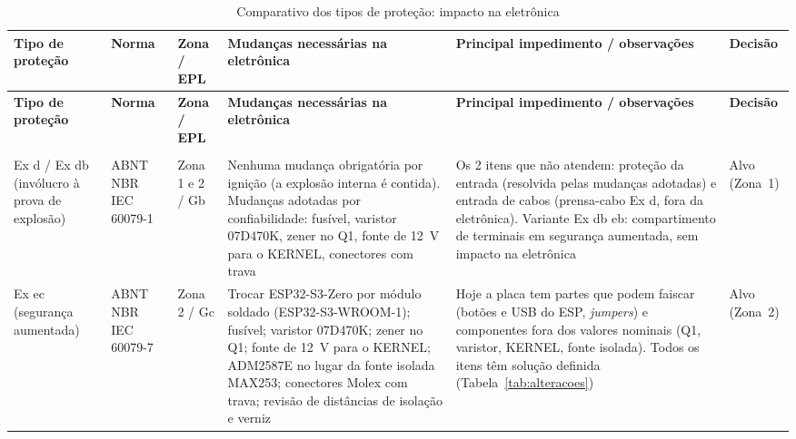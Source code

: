 \documentclass[a4paper, 12pt]{article}
\begin{document}
{\footnotesize
\renewcommand{\arraystretch}{1.25}
\begin{longtable}{|>{\raggedright\arraybackslash}p{2.0cm}|>{\raggedright\arraybackslash}p{1.6cm}|>{\raggedright\arraybackslash}p{1.4cm}|>{\raggedright\arraybackslash}p{3.5cm}|>{\raggedright\arraybackslash}p{3.3cm}|>{\raggedright\arraybackslash}p{1.85cm}|}
    \caption{Comparativo dos tipos de proteção: impacto na eletrônica}\label{tab:tiposprotecao}\\
    \hline
    \centering\arraybackslash\textbf{Tipo de proteção} & \centering\arraybackslash\textbf{Norma} & \centering\arraybackslash\textbf{Zona / EPL} & \centering\arraybackslash\textbf{Mudanças necessárias na eletrônica} & \centering\arraybackslash\textbf{Principal impedimento / observações} & \centering\arraybackslash\textbf{Decisão} \\ \hline
    \endfirsthead
    \hline
    \centering\arraybackslash\textbf{Tipo de proteção} & \centering\arraybackslash\textbf{Norma} & \centering\arraybackslash\textbf{Zona / EPL} & \centering\arraybackslash\textbf{Mudanças necessárias na eletrônica} & \centering\arraybackslash\textbf{Principal impedimento / observações} & \centering\arraybackslash\textbf{Decisão} \\ \hline
    \endhead
    \multicolumn{6}{r}{\textit{continua na próxima página}} \\
    \endfoot
    \endlastfoot
    Ex d / Ex db (invólucro à prova de explosão) & ABNT NBR IEC 60079-1 & Zona 1 e 2 / Gb & Nenhuma mudança obrigatória por ignição (a explosão interna é contida). Mudanças adotadas por confiabilidade: fusível, varistor 07D470K, zener no Q1, fonte de 12~V para o KERNEL, conectores com trava & Os 2 itens que não atendem: proteção da entrada (resolvida pelas mudanças adotadas) e entrada de cabos (prensa-cabo Ex d, fora da eletrônica). Variante Ex db eb: compartimento de terminais em segurança aumentada, sem impacto na eletrônica & Alvo (Zona~1) \\ \hline
    Ex ec (segurança aumentada) & ABNT NBR IEC 60079-7 & Zona 2 / Gc & Trocar ESP32-S3-Zero por módulo soldado (ESP32-S3-WROOM-1); fusível; varistor 07D470K; zener no Q1; fonte de 12~V para o KERNEL; ADM2587E no lugar da fonte isolada MAX253; conectores Molex com trava; revisão de distâncias de isolação e verniz & Hoje a placa tem partes que podem faiscar (botões e USB do ESP, \textit{jumpers}) e componentes fora dos valores nominais (Q1, varistor, KERNEL, fonte isolada). Todos os itens têm solução definida (Tabela~\ref{tab:alteracoes}) & Alvo (Zona~2) \\ \hline

\end{longtable}}
\end{document}
